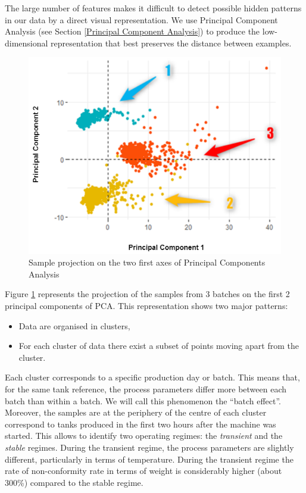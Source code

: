 The large number of features makes it difficult to detect possible hidden patterns in our data by a direct visual representation. We use Principal Component Analysis (see Section \ref{Principal Component Analysis}) to produce the low-dimensional representation that best preserves the distance between examples. 
%
\begin{figure}
\centerline{\includegraphics[scale=0.5]{images/chapter_3/PCA.png}}
\caption{Sample projection on the two first axes of Principal Components Analysis}
\label{fig:pca}
\end{figure}
%
Figure \ref{fig:pca} represents the projection of the samples from 3 batches on the first 2 principal components of PCA. This representation shows two major patterns:
\begin{itemize}
    \item Data are organised in clusters,
    \item For each cluster of data there exist a subset of points moving apart from the cluster.
\end{itemize}
%
Each cluster corresponds to a specific production day or batch. This means that, for the same tank reference, the process parameters differ more between each batch than within a batch. We will call this phenomenon the ``batch effect''. Moreover, the samples are at the periphery of the centre of each cluster correspond to tanks produced in the first two hours after the machine was started. This allows to identify two operating regimes: the \textit{transient} and the \textit{stable} regimes. During the transient regime, the process parameters are slightly different, particularly in terms of temperature. During the transient regime the rate of non-conformity rate in terms of weight is considerably higher (about 300\%) compared to the stable regime.    

